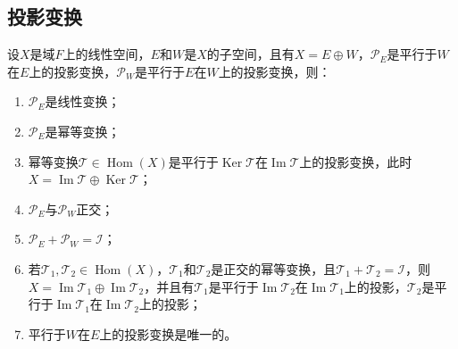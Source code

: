 \subsection{投影变换}
\begin{property}\label{prop:ProjectionTransformation}
	设$X$是域$F$上的线性空间，$E$和$W$是$X$的子空间，且有$X=E\oplus W$，$\mathcal{P}_E$是平行于$W$在$E$上的投影变换，$\mathcal{P}_W$是平行于$E$在$W$上的投影变换，则：
	\begin{enumerate}
		\item $\mathcal{P}_E$是线性变换；
		\item $\mathcal{P}_E$是幂等变换；
		\item 幂等变换$\mathcal{T}\in\operatorname{Hom}(X)$是平行于$\operatorname{Ker}\mathcal{T}$在$\operatorname{Im}\mathcal{T}$上的投影变换，此时$X=\operatorname{Im}\mathcal{T}\oplus\operatorname{Ker}\mathcal{T}$；
		\item $\mathcal{P}_E$与$\mathcal{P}_W$正交；
		\item $\mathcal{P}_E+\mathcal{P}_W=\mathcal{I}$；
		\item 若$\mathcal{T}_1,\mathcal{T}_2\in\operatorname{Hom}(X)$，$\mathcal{T}_1$和$\mathcal{T}_2$是正交的幂等变换，且$\mathcal{T}_1+\mathcal{T}_2=\mathcal{I}$，则$X=\operatorname{Im}\mathcal{T}_1\oplus\operatorname{Im}\mathcal{T}_2$，并且有$\mathcal{T}_1$是平行于$\operatorname{Im}\mathcal{T}_2$在$\operatorname{Im}\mathcal{T}_1$上的投影，$\mathcal{T}_2$是平行于$\operatorname{Im}\mathcal{T}_1$在$\operatorname{Im}\mathcal{T}_2$上的投影；
		\item 平行于$W$在$E$上的投影变换是唯一的。
	\end{enumerate}
\end{property}
